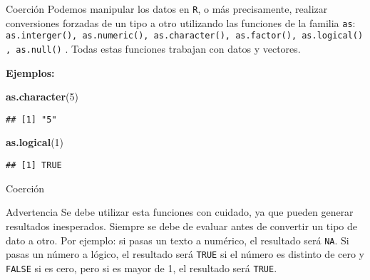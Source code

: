 \documentclass[
  ignorenonframetext,
]{beamer}
\newenvironment{Shaded}{\begin{snugshade}}{\end{snugshade}}
\newcommand{\DecValTok}[1]{\textcolor[rgb]{0.00,0.00,0.81}{#1}}
\newcommand{\FunctionTok}[1]{\textcolor[rgb]{0.13,0.29,0.53}{\textbf{#1}}}
\newcommand{\NormalTok}[1]{#1}
\begin{document}
\begin{frame}[fragile]{Coerción}
\label{coerciuxf3n}
Podemos manipular los datos en \texttt{R}, o más precisamente, realizar
conversiones forzadas de un tipo a otro utilizando las funciones de la
familia \texttt{as}:
\texttt{as.interger(),\ as.numeric(),\ as.character(),\ as.factor(),\ as.logical(),\ as.null()}
. Todas estas funciones trabajan con datos y vectores.

\textbf{Ejemplos:}

\begin{Shaded}
\begin{Highlighting}[]
\FunctionTok{as.character}\NormalTok{(}\DecValTok{5}\NormalTok{)}
\end{Highlighting}
\end{Shaded}

\begin{verbatim}
## [1] "5"
\end{verbatim}

\begin{Shaded}
\begin{Highlighting}[]
\FunctionTok{as.logical}\NormalTok{(}\DecValTok{1}\NormalTok{)}
\end{Highlighting}
\end{Shaded}

\begin{verbatim}
## [1] TRUE
\end{verbatim}
\end{frame}

\begin{frame}[fragile]{Coerción}
\label{coerciuxf3n-1}
\begin{block}{Advertencia}
\label{advertencia-1}
Se debe utilizar esta funciones con cuidado, ya que pueden generar
resultados inesperados. Siempre se debe de evaluar antes de convertir un
tipo de dato a otro. Por ejemplo: si pasas un texto a numérico, el
resultado será \texttt{NA}. Si pasas un número a lógico, el resultado
será \texttt{TRUE} si el número es distinto de cero y \texttt{FALSE} si
es cero, pero si es mayor de 1, el resultado será \texttt{TRUE}.
\end{block}
\end{frame}
\end{document}
